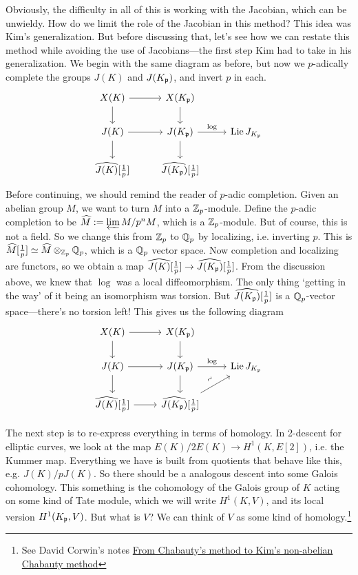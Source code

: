 Obviously, the difficulty in all of this is working with the Jacobian, which can be unwieldy. How do we limit the role of the Jacobian in this method? This idea was Kim's generalization. But before discussing that, let's see how we can restate this method while avoiding the use of Jacobians---the first step Kim had to take in his generalization. We begin with the same diagram as before, but now we $p$-adically complete the groups $J(K)$ and $J(K_{\mathfrak{p}})$, and invert $p$ in each. 
	\[
	\begin{tikzcd}
	X(K) \arrow{d} \arrow{r} & X(K_\p) \arrow{d} \\
	J(K) \arrow{r} \arrow{d} & J(K_\p) \arrow{r}{\log} \arrow{d} & \lie J_{K_\p} \\
	\widehat{J(K)}[\frac{1}{p}] & \widehat{J(K_\p)}[\frac{1}{p}] 
	\end{tikzcd}
	\]
Before continuing, we should remind the reader of $p$-adic completion. Given an abelian group $M$, we want to turn $M$ into a $\mathbb{Z}_p$-module. Define the $p$-adic completion to be $\widehat{M}:= \varprojlim M/p^nM$, which is a $\mathbb{Z}_p$-module. But of course, this is not a field. So we change this from $\mathbb{Z}_p$ to $\mathbb{Q}_p$ by localizing, i.e. inverting $p$. This is $\widehat{M}[\frac{1}{p}] \simeq \widehat{M} \otimes_{\mathbb{Z}_p} \mathbb{Q}_p$, which is a $\mathbb{Q}_p$ vector space. Now completion and localizing are functors, so we obtain a map $\widehat{J(K)}[\frac{1}{p}] \to \widehat{J(K_{\mathfrak{p}})}[\frac{1}{p}]$. From the discussion above, we knew that $\log$ was a local diffeomorphism. The only thing `getting in the way' of it being an isomorphism was torsion. But $\widehat{J(K_{\mathfrak{p}})}[\frac{1}{p}]$ is a $\mathbb{Q}_p$-vector space---there's no torsion left! This gives us the following diagram
	\[
	\begin{tikzcd}
	X(K) \arrow{d} \arrow{r} & X(K_\p) \arrow{d} \\
	J(K) \arrow{r} \arrow{d} & J(K_\p) \arrow{r}{\log} \arrow{d} & \lie J_{K_\p} \\
	\widehat{J(K)}[\frac{1}{p}] \arrow{r} & \widehat{J(K_\p)}[\frac{1}{p}] \arrow{ur}{\rotatebox{45}{$\sim$}} 
	\end{tikzcd}
	\]
 

The next step is to re-express everything in terms of \etale homology. In 2-descent for elliptic curves, we look at the map $E(K)/2E(K) \to H^1(K,E[2])$, i.e. the Kummer map. Everything we have is built from quotients that behave like this, e.g. $J(K)/pJ(K)$. So there should be a analogous descent into some Galois cohomology. This something is the cohomology of the Galois group of $K$ acting on some kind of Tate module, which we will write $H^1(K,V)$, and its local version $H^1(K_{\mathfrak{p}},V)$. But what is $V$? We can think of $V$ as some kind of \etale homology.\footnote{See David Corwin's notes \href{https://math.berkeley.edu/~dcorwin/files/ChabautytoKim.pdf}{From Chabauty's method to Kim's non-abelian Chabauty method}} 



